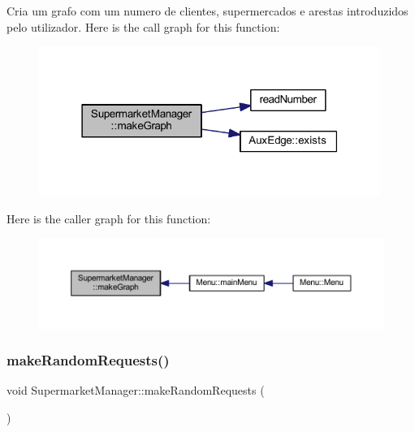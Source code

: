 Cria um grafo com um numero de clientes, supermercados e arestas introduzidos pelo utilizador. Here is the call graph for this function\+:
\nopagebreak
\begin{figure}[H]
\begin{center}
\leavevmode
\includegraphics[width=315pt]{class_supermarket_manager_abab275f63e6169a76efd92c90aaac0b4_cgraph}
\end{center}
\end{figure}
Here is the caller graph for this function\+:
\nopagebreak
\begin{figure}[H]
\begin{center}
\leavevmode
\includegraphics[width=350pt]{class_supermarket_manager_abab275f63e6169a76efd92c90aaac0b4_icgraph}
\end{center}
\end{figure}
\mbox{\label{class_supermarket_manager_a6dbf83eef3433341c7a971860e3b8915}} 
\subsubsection{\texorpdfstring{make\+Random\+Requests()}{makeRandomRequests()}}
{\footnotesize\ttfamily void Supermarket\+Manager\+::make\+Random\+Requests (\begin{DoxyParamCaption}{ }\end{DoxyParamCaption})}


